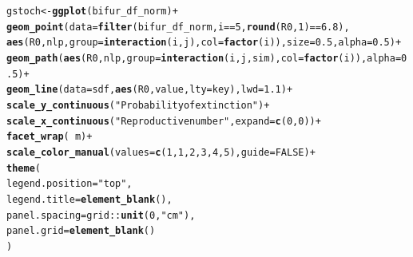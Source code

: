 \documentclass[12pt]{article}\usepackage[]{graphicx}\usepackage[]{color}
\makeatletter
\newcommand{\hlnum}[1]{\textcolor[rgb]{0.686,0.059,0.569}{#1}}%
\newcommand{\hlstr}[1]{\textcolor[rgb]{0.192,0.494,0.8}{#1}}%
\newcommand{\hlopt}[1]{\textcolor[rgb]{0,0,0}{#1}}%
\newcommand{\hlstd}[1]{\textcolor[rgb]{0.345,0.345,0.345}{#1}}%
\newcommand{\hlkwb}[1]{\textcolor[rgb]{0.69,0.353,0.396}{#1}}%
\newcommand{\hlkwc}[1]{\textcolor[rgb]{0.333,0.667,0.333}{#1}}%
\newcommand{\hlkwd}[1]{\textcolor[rgb]{0.737,0.353,0.396}{\textbf{#1}}}%
\newenvironment{kframe}{%
 \def\at@end@of@kframe{}%
 \ifinner\ifhmode%
  \def\at@end@of@kframe{\end{minipage}}%
  \begin{minipage}{\columnwidth}%
 \fi\fi%
 \def\FrameCommand##1{\hskip\@totalleftmargin \hskip-\fboxsep
 \colorbox{shadecolor}{##1}\hskip-\fboxsep
     \hskip-\linewidth \hskip-\@totalleftmargin \hskip\columnwidth}%
 \MakeFramed {\advance\hsize-\width
   \@totalleftmargin\z@ \linewidth\hsize
   \@setminipage}}%
 {\par\unskip\endMakeFramed%
 \at@end@of@kframe}
\newenvironment{knitrout}{}{} %
\makeatother
\begin{document}
\begin{knitrout}
\color{fgcolor}\begin{kframe}
\begin{alltt}
\hlstd{gstoch} \hlkwb{<-} \hlkwd{ggplot}\hlstd{(bifur_df_norm)} \hlopt{+}
    \hlkwd{geom_point}\hlstd{(}\hlkwc{data}\hlstd{=}\hlkwd{filter}\hlstd{(bifur_df_norm, i}\hlopt{==}\hlnum{5}\hlstd{,} \hlkwd{round}\hlstd{(R0,} \hlnum{1}\hlstd{)}\hlopt{==}\hlnum{6.8}\hlstd{),}
               \hlkwd{aes}\hlstd{(R0, nlp,} \hlkwc{group}\hlstd{=}\hlkwd{interaction}\hlstd{(i, j),} \hlkwc{col}\hlstd{=}\hlkwd{factor}\hlstd{(i)),} \hlkwc{size}\hlstd{=}\hlnum{0.5}\hlstd{,} \hlkwc{alpha}\hlstd{=}\hlnum{0.5}\hlstd{)} \hlopt{+}
    \hlkwd{geom_path}\hlstd{(}\hlkwd{aes}\hlstd{(R0, nlp,} \hlkwc{group}\hlstd{=}\hlkwd{interaction}\hlstd{(i, j, sim),} \hlkwc{col}\hlstd{=}\hlkwd{factor}\hlstd{(i)),} \hlkwc{alpha}\hlstd{=}\hlnum{0.5}\hlstd{)} \hlopt{+}
    \hlkwd{geom_line}\hlstd{(}\hlkwc{data}\hlstd{=sdf,} \hlkwd{aes}\hlstd{(R0, value,} \hlkwc{lty}\hlstd{=key),} \hlkwc{lwd}\hlstd{=}\hlnum{1.1}\hlstd{)} \hlopt{+}
    \hlkwd{scale_y_continuous}\hlstd{(}\hlstr{"Probability of extinction"}\hlstd{)} \hlopt{+}
    \hlkwd{scale_x_continuous}\hlstd{(}\hlstr{"Reproductive number"}\hlstd{,} \hlkwc{expand}\hlstd{=}\hlkwd{c}\hlstd{(}\hlnum{0}\hlstd{,}\hlnum{0}\hlstd{))} \hlopt{+}
    \hlkwd{facet_wrap}\hlstd{(}\hlopt{~}\hlstd{m)} \hlopt{+}
    \hlkwd{scale_color_manual}\hlstd{(}\hlkwc{values}\hlstd{=}\hlkwd{c}\hlstd{(}\hlnum{1}\hlstd{,} \hlnum{1}\hlstd{,} \hlnum{2}\hlstd{,} \hlnum{3}\hlstd{,} \hlnum{4}\hlstd{,} \hlnum{5}\hlstd{),} \hlkwc{guide}\hlstd{=}\hlnum{FALSE}\hlstd{)} \hlopt{+}
    \hlkwd{theme}\hlstd{(}
        \hlkwc{legend.position} \hlstd{=} \hlstr{"top"}\hlstd{,}
        \hlkwc{legend.title} \hlstd{=} \hlkwd{element_blank}\hlstd{(),}
        \hlkwc{panel.spacing} \hlstd{= grid}\hlopt{::}\hlkwd{unit}\hlstd{(}\hlnum{0}\hlstd{,} \hlstr{"cm"}\hlstd{),}
        \hlkwc{panel.grid} \hlstd{=} \hlkwd{element_blank}\hlstd{()}
    \hlstd{)}


\end{alltt}
\end{kframe}
\end{knitrout}
\end{document}
